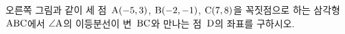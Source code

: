 \noindent\begin{minipage}[t]{0.58\linewidth}\vspace{0pt}\raggedright 오른쪽 그림과 같이 세 점~$\mathrm{A}(-5{,}\mkern3mu\mathopen{}3)$, $\mathrm{B}(-2{,}\mkern3mu\mathopen{}-1)$, $\mathrm{C}(7{,}\mkern3mu\mathopen{}8)$을 꼭짓점으로 하는 삼각형~$\mathrm{ABC}$에서 $\angle\mathrm{A}$의 이등분선이 변~$\mathrm{BC}$와 만나는 점~$\mathrm{D}$의 좌표를 구하시오.\end{minipage}\hfill\begin{minipage}[t]{0.4\linewidth}\vspace{0pt}\centering \resizebox{\ifdim\width>\linewidth\linewidth\else\width\fi}{!}{}\end{minipage}\par
